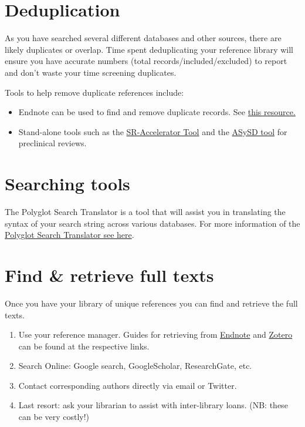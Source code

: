 \documentclass[
]{book}
\providecommand{\tightlist}{%
  \setlength{\itemsep}{0pt}\setlength{\parskip}{0pt}}
\begin{document}
\hypertarget{deduplication}{%
\section{Deduplication}\label{deduplication}}

As you have searched several different databases and other sources, there are likely duplicates or overlap. Time spent deduplicating your reference library will ensure you have accurate numbers (total records/included/excluded) to report and don't waste your time screening duplicates.

Tools to help remove duplicate references include:

\begin{itemize}
\tightlist
\item
  Endnote can be used to find and remove duplicate records. See \href{10.3163/1536-5050.104.3.014}{this resource.}
\item
  Stand-alone tools such as the \href{https://doi.org/10.1186/2046-4053-4-6}{SR-Accelerator Tool} and the \href{https://camarades.shinyapps.io/RDedup/}{ASySD tool} for preclinical reviews.
\end{itemize}

\hypertarget{searching-tools}{%
\section{Searching tools}\label{searching-tools}}

The Polyglot Search Translator is a tool that will assist you in translating the syntax of your search string across various databases. For more information of the \href{https://sr-accelerator.com/\#/polyglot}{Polyglot Search Translator see here}.

\hypertarget{find-retrieve-full-texts}{%
\section{Find \& retrieve full texts}\label{find-retrieve-full-texts}}

Once you have your library of unique references you can find and retrieve the full texts.

\begin{enumerate}
\def\labelenumi{\arabic{enumi}.}
\tightlist
\item
  Use your reference manager. Guides for retrieving from \href{https://subjectguides.library.american.edu/c.php?g=479020\&p=3324236}{Endnote} and \href{https://www.zotero.org/support/locate}{Zotero} can be found at the respective links.
\item
  Search Online: Google search, GoogleScholar, ResearchGate, etc.
\item
  Contact corresponding authors directly via email or Twitter.
\item
  Last resort: ask your librarian to assist with inter-library loans. (NB: these can be very costly!)
\end{enumerate}
\end{document}
